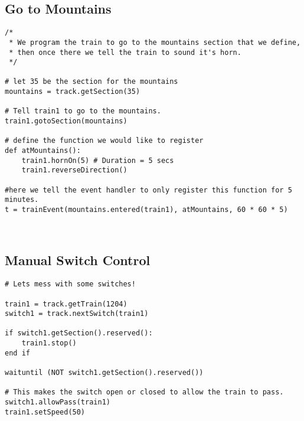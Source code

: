 \documentclass[a4paper,11pt,notitlepage]{article}
\begin{document}
\subsection{Go to Mountains}
\begin{verbatim}
/*
 * We program the train to go to the mountains section that we define,
 * then once there we tell the train to sound it's horn.
 */

# let 35 be the section for the mountains
mountains = track.getSection(35)

# Tell train1 to go to the mountains.
train1.gotoSection(mountains)

# define the function we would like to register
def atMountains():
	train1.hornOn(5) # Duration = 5 secs
    train1.reverseDirection()

#here we tell the event handler to only register this function for 5 minutes.
t = trainEvent(mountains.entered(train1), atMountains, 60 * 60 * 5)



\end{verbatim}
\subsection{Manual Switch Control}
\begin{verbatim}
# Lets mess with some switches!

train1 = track.getTrain(1204)
switch1 = track.nextSwitch(train1)

if switch1.getSection().reserved():
    train1.stop()
end if

waituntil (NOT switch1.getSection().reserved())

# This makes the switch open or closed to allow the train to pass.
switch1.allowPass(train1)
train1.setSpeed(50)
\end{verbatim}
\end{document}
